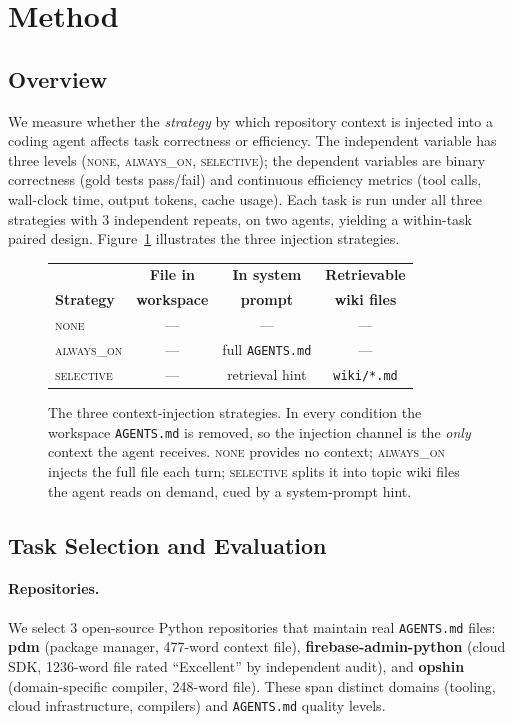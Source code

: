 \documentclass[11pt]{article}
\newcommand{\agentsmd}{\texttt{AGENTS.md}}
\newcommand{\none}{\textsc{none}}
\newcommand{\alwayson}{\textsc{always\_on}}
\newcommand{\selective}{\textsc{selective}}
\begin{document}
\section{Method}

\subsection{Overview}

We measure whether the \emph{strategy} by which repository context is injected into a coding agent affects task correctness or efficiency.
The independent variable has three levels (\none{}, \alwayson{}, \selective{}); the dependent variables are binary correctness (gold tests pass/fail) and continuous efficiency metrics (tool calls, wall-clock time, output tokens, cache usage).
Each task is run under all three strategies with 3 independent repeats, on two agents, yielding a within-task paired design.
Figure~\ref{fig:strategies} illustrates the three injection strategies.

\begin{figure}[t]
\centering
\small
\setlength{\tabcolsep}{4pt}
\renewcommand{\arraystretch}{1.25}
\begin{tabular}{@{}lccc@{}}
\toprule
& \textbf{File in} & \textbf{In system} & \textbf{Retrievable} \\
\textbf{Strategy} & \textbf{workspace} & \textbf{prompt} & \textbf{wiki files} \\
\midrule
\none      & --- & --- & --- \\
\alwayson  & --- & full \agentsmd{} & --- \\
\selective & --- & retrieval hint & \texttt{wiki/*.md} \\
\bottomrule
\end{tabular}
\caption{The three context-injection strategies. In every condition the workspace \agentsmd{} is removed, so the injection channel is the \emph{only} context the agent receives. \none{} provides no context; \alwayson{} injects the full file each turn; \selective{} splits it into topic wiki files the agent reads on demand, cued by a system-prompt hint.}
\label{fig:strategies}
\end{figure}

\subsection{Task Selection and Evaluation}

\paragraph{Repositories.}
We select 3 open-source Python repositories that maintain real \agentsmd{} files:
\textbf{pdm} (package manager, 477-word context file),
\textbf{firebase-admin-python} (cloud SDK, 1236-word file rated ``Excellent'' by independent audit), and
\textbf{opshin} (domain-specific compiler, 248-word file).
These span distinct domains (tooling, cloud infrastructure, compilers) and \agentsmd{} quality levels.
\end{document}
